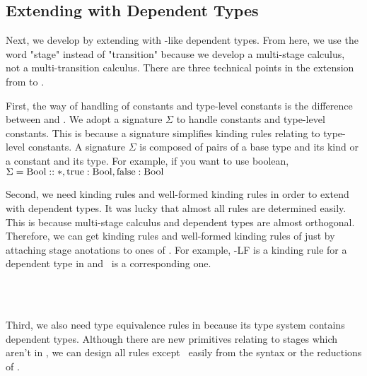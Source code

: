 \subsection{Extending \LTP with Dependent Types}

Next, we develop \LMD by extending \LTP with \LLF-like dependent types.
From here, we use the word "stage" instead of "transition" 
because we develop a multi-stage calculus, not a multi-transition calculus.
There are three technical points in the extension from \LTP to \LMD.


First, the way of handling of constants and type-level constants is the difference between \LMD and \LTP.
We adopt a signature $\Sigma$ to handle constants and type-level constants.
This is because a signature simplifies kinding rules relating to type-level constants.
A signature $\Sigma$ is composed of pairs of a base type and its kind or a constant and its type.
For example, if you want to use boolean, $\Sigma = \textrm{Bool}::*, \text{true}:\textrm{Bool}, \text{false}:\textrm{Bool}$


Second, we need kinding rules and well-formed kinding rules in order to extend \LMD with dependent types.
It was lucky that almost all rules are determined easily.
This is because multi-stage calculus and dependent types are almost orthogonal.
Therefore, we can get kinding rules and well-formed kinding rules of \LMD just by 
attaching stage anotations to ones of \LLF.
For example, \KAbs-LF is a kinding rule for a dependent type in \LLF and \KAbs\ is a corresponding one.
\begin{center}
	 \\[2mm]
	 \\[2mm]
\end{center}


Third, we also need type equivalence rules in \LMD because its type system contains dependent types.
Although there are new primitives relating to stages which aren't in \LLF,
we can design all rules except \QPercent\ easily from the syntax or the reductions of \LMD.

